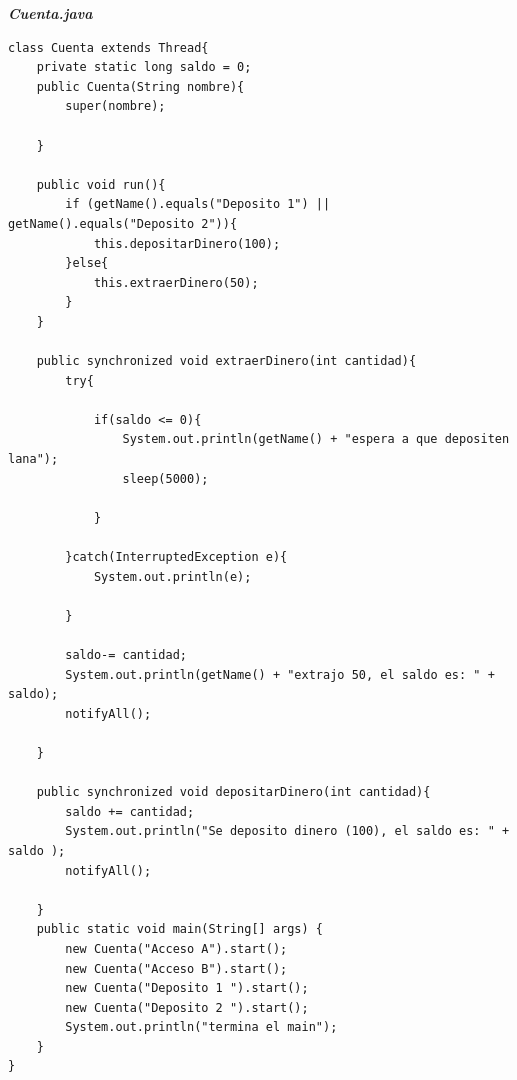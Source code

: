 \documentclass[11pt, twocolumn]{article}
\begin{document}
  \textit{\textbf{Cuenta.java}}
  \begin{lstlisting}
class Cuenta extends Thread{
	private static long saldo = 0;
	public Cuenta(String nombre){
		super(nombre);

	}

	public void run(){
		if (getName().equals("Deposito 1") || getName().equals("Deposito 2")){
			this.depositarDinero(100);
		}else{
			this.extraerDinero(50);
		}
	}

	public synchronized void extraerDinero(int cantidad){
		try{

			if(saldo <= 0){
				System.out.println(getName() + "espera a que depositen lana");
				sleep(5000);

			}

		}catch(InterruptedException e){
			System.out.println(e);

		}

		saldo-= cantidad;
		System.out.println(getName() + "extrajo 50, el saldo es: " + saldo);
		notifyAll();

	}

	public synchronized void depositarDinero(int cantidad){
		saldo += cantidad;
		System.out.println("Se deposito dinero (100), el saldo es: " + saldo );
		notifyAll();

	}
	public static void main(String[] args) {
		new Cuenta("Acceso A").start();
		new Cuenta("Acceso B").start();
		new Cuenta("Deposito 1 ").start();
		new Cuenta("Deposito 2 ").start();
		System.out.println("termina el main");
	}
}
  \end{lstlisting}
\end{document}
